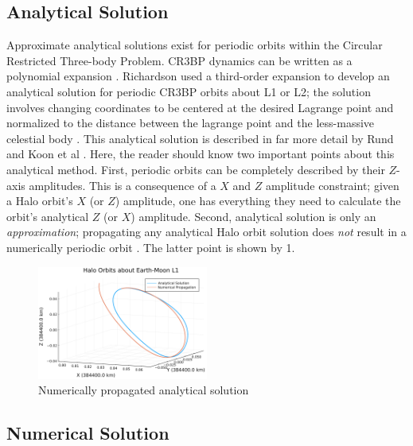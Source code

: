 \documentclass[conf]{new-aiaa}
\begin{document}
\begin{multicols*}{2}
\subsection{Analytical Solution}
Approximate analytical solutions exist for periodic orbits within
the Circular Restricted Three-body Problem. CR3BP dynamics can 
be written as a polynomial expansion 
\cite{koon2008dynamical}. 
Richardson used a third-order expansion to develop an 
analytical solution for periodic CR3BP orbits about L1 or L2;
the solution involves changing coordinates to be centered 
at the desired Lagrange point and normalized to the 
distance between the lagrange point and the less-massive 
celestial body 
\cite{koon2008dynamical} 
\cite{richardson1980analytical}
\cite{rund2018interplanetary}.
This analytical solution is described in far more detail 
by Rund and Koon et al 
\cite{rund2018interplanetary} 
\cite{koon2008dynamical}.
Here, the reader should know two important points 
about this analytical method. First, periodic orbits
can be completely described by their $Z$-axis amplitudes.
This is a consequence of a $X$ and $Z$ amplitude constraint;
given a Halo orbit's $X$ (or $Z$) amplitude, one has everything
they need to calculate the orbit's analytical $Z$ (or $X$) 
amplitude. Second, analytical solution is only 
an \textit{approximation}; propagating any 
analytical Halo orbit solution does \textit{not} result 
in a numerically periodic orbit
\cite{koon2008dynamical}.
The latter point is shown by \figurename{1}.

\vskip -0.3cm
\begin{figure}[H]
    \hskip -0.3cm
    \includegraphics[width=0.5\textwidth]{analytical_propagation.png}
    \caption{Numerically propagated analytical solution}
\end{figure}

\subsection{Numerical Solution}


\end{multicols*}
\end{document}

